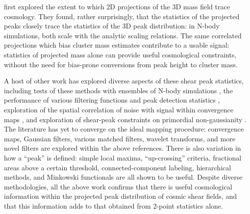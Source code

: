 \citet{Marian09,Marian10} first explored the extent to which 2D 
projections of the
3D mass field trace cosmology.  They found, rather surprisingly, that the
statistics of the projected peaks closely trace the statistics of the 3D
peak distribution: in N-body simulations, both scale 
with the \citet{Sheth99} analytic
scaling relations.  The same correlated projections which bias
cluster mass estimates contribute to a usable signal: 
statistics of projected mass alone can provide useful cosmological 
constraints, without the need for bias-prone conversions from peak 
height to cluster mass.

A host of other work has explored diverse aspects of these
shear peak statistics,
including tests of these methods with ensembles of N-body simulations
\citep{Wang09,Kratochvil10,Dietrich10},
the performance of various filtering functions
and peak detection statistics \citep{Pires09,Schmidt10,Kratochvil11},
exploration of the spatial correlation of noise with signal
within convergence maps \citep{Fan10},
and exploration of shear-peak constraints on primordial non-gaussianity
\citep{Maturi11}.  The literature has yet to converge
on the ideal mapping procedure: convergence maps, Gaussian filters,
various matched filters, wavelet transforms, and more novel filters
are explored within the above references.  There is also variation in
how a ``peak'' is defined: simple local maxima, ``up-crossing'' criteria, 
fractional areas above a certain threshold, connected-component labeling, 
hierarchical methods, and Minkowski functionals are all shown to be useful.  
Despite diverse methodologies, all the above work confirms that there 
is useful cosmological information within the projected peak 
distribution of cosmic shear fields, and that this information adds to 
that obtained from 2-point statistics alone.

